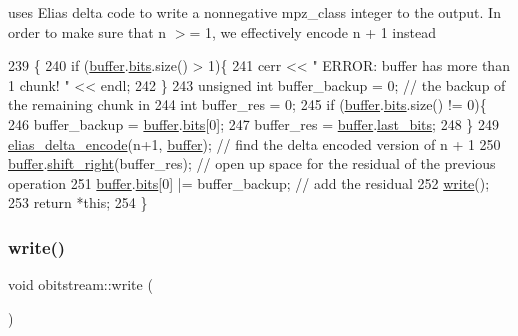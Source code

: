 uses Elias delta code to write a nonnegative mpz\+\_\+class integer to the output. In order to make sure that n $>$= 1, we effectively encode n + 1 instead 


\begin{DoxyCode}
239                                                       \{
240   \textcolor{keywordflow}{if} (\hyperlink{classobitstream_aeaccad00a395a404aa16472bfa052be3}{buffer}.\hyperlink{classbit__pipe_a86f38af1e9736b053728033490476b50}{bits}.size() > 1)\{
241     cerr << \textcolor{stringliteral}{" ERROR: buffer has more than 1 chunk! "} << endl;
242   \}
243   \textcolor{keywordtype}{unsigned} \textcolor{keywordtype}{int} buffer\_backup = 0; \textcolor{comment}{// the backup of the remaining chunk in }
244   \textcolor{keywordtype}{int} buffer\_res = 0; 
245   \textcolor{keywordflow}{if} (\hyperlink{classobitstream_aeaccad00a395a404aa16472bfa052be3}{buffer}.\hyperlink{classbit__pipe_a86f38af1e9736b053728033490476b50}{bits}.size() != 0)\{
246     buffer\_backup = \hyperlink{classobitstream_aeaccad00a395a404aa16472bfa052be3}{buffer}.\hyperlink{classbit__pipe_a86f38af1e9736b053728033490476b50}{bits}[0];
247     buffer\_res = \hyperlink{classobitstream_aeaccad00a395a404aa16472bfa052be3}{buffer}.\hyperlink{classbit__pipe_a0f3e84b02751803adaab499b5dad86fe}{last\_bits};
248   \}
249   \hyperlink{bitstream_8cpp_a63daa014203b9a5b2622a264cbfdff7b}{elias\_delta\_encode}(n+1, \hyperlink{classobitstream_aeaccad00a395a404aa16472bfa052be3}{buffer}); \textcolor{comment}{// find the delta encoded version of n + 1 }
250   \hyperlink{classobitstream_aeaccad00a395a404aa16472bfa052be3}{buffer}.\hyperlink{classbit__pipe_a341a1f62d728a67f730503ca722a7770}{shift\_right}(buffer\_res); \textcolor{comment}{// open up space for the residual of the previous
       operation}
251   \hyperlink{classobitstream_aeaccad00a395a404aa16472bfa052be3}{buffer}.\hyperlink{classbit__pipe_a86f38af1e9736b053728033490476b50}{bits}[0] |= buffer\_backup; \textcolor{comment}{// add the residual}
252   \hyperlink{classobitstream_a5ac23633932baad040856f0a33ee1ebf}{write}();
253   \textcolor{keywordflow}{return} *\textcolor{keyword}{this};
254 \}
\end{DoxyCode}
\mbox{\label{classobitstream_a5ac23633932baad040856f0a33ee1ebf}} 
\subsubsection{\texorpdfstring{write()}{write()}}
{\footnotesize\ttfamily void obitstream\+::write (\begin{DoxyParamCaption}{ }\end{DoxyParamCaption})\hspace{0.3cm}{\ttfamily [private]}}




